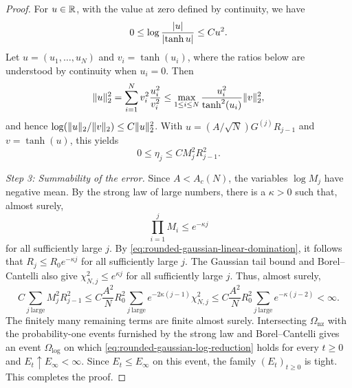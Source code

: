 \documentclass[11pt,reqno,a4paper]{article}
\begin{document}
\begin{proof}
  For $u\in\mathbb{R}$, with the value at zero defined by continuity, we have
  \begin{equation*}
    0\leq
    \log\frac{\abs u}{\abs{\tanh u}}
    \leq
    C u^2 .
  \end{equation*}
  Let $u=(u_1,\ldots,u_N)$ and $v_i=\tanh(u_i)$, where the ratios below are
  understood by continuity when $u_i=0$. Then
  \begin{equation*}
    \lVert u\rVert_2^2
    =
    \sum_{i=1}^N v_i^2\frac{u_i^2}{v_i^2}
    \leq
    \max_{1\leq i\leq N}\frac{u_i^2}{\tanh^2(u_i)}\lVert v\rVert_2^2,
  \end{equation*}
  and hence $\log(\lVert u\rVert_2/\lVert v\rVert_2)\leq C\lVert u\rVert_2^2$. With
  $u=(A/\sqrt N)G^{(j)}R_{j-1}$ and $v=\tanh(u)$, this yields
  \begin{equation}\label{eq:rounded-gaussian-nonlinear-error}
    0\leq\eta_j
    \leq
    CM_j^2R_{j-1}^2.
  \end{equation}

  \emph{Step 3: Summability of the error.}
  Since $A<A_c(N)$, the variables $\log M_j$ have negative mean. By the strong
  law of large numbers, there is a $\kappa>0$ such that, almost surely,
  \begin{equation*}
    \prod_{i=1}^jM_i\leq e^{-\kappa j}
  \end{equation*}
  for all sufficiently large $j$. By
  \cref{eq:rounded-gaussian-linear-domination}, it follows that
  $R_j\leq R_0e^{-\kappa j}$ for all sufficiently large $j$. The Gaussian tail
  bound and Borel--Cantelli also give
  $\chi_{N,j}^2\leq e^{\kappa j}$ for all sufficiently large $j$. Thus,
  almost surely,
  \begin{equation*}
    C\sum_{j\ \mathrm{large}}M_j^2R_{j-1}^2
    \leq
    C\frac{A^2}{N}R_0^2
    \sum_{j\ \mathrm{large}}e^{-2\kappa(j-1)}\chi_{N,j}^2
    \leq
    C\frac{A^2}{N}R_0^2
    \sum_{j\ \mathrm{large}}e^{-\kappa(j-2)}
    <\infty.
  \end{equation*}
  The finitely many remaining terms are finite almost surely. Intersecting
  $\Omega_{\mathrm{nz}}$ with the probability-one events furnished by the
  strong law and Borel--Cantelli gives an event $\Omega_{\log}$ on which
  \cref{eq:rounded-gaussian-log-reduction} holds for every $t\geq0$ and
  $E_t\uparrow E_\infty<\infty$. Since $E_t\leq E_\infty$ on this event, the
  family $(E_t)_{t\geq0}$ is tight. This completes the proof.
\end{proof}
\end{document}
